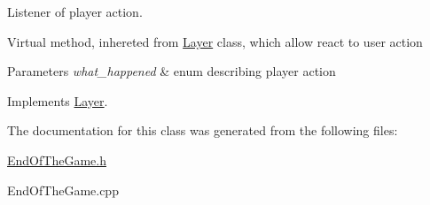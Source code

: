 Listener of player action. 

Virtual method, inhereted from \hyperlink{class_layer}{Layer} class, which allow react to user action 
\begin{DoxyParams}{Parameters}
{\em what\+\_\+happened} & enum describing player action \\
\hline
\end{DoxyParams}


Implements \hyperlink{class_layer_a41318993a0f6c7ba3bc6d964f7802c10}{Layer}.



The documentation for this class was generated from the following files\+:\begin{DoxyCompactItemize}
\item 
\hyperlink{_end_of_the_game_8h}{End\+Of\+The\+Game.\+h}\item 
End\+Of\+The\+Game.\+cpp\end{DoxyCompactItemize}
